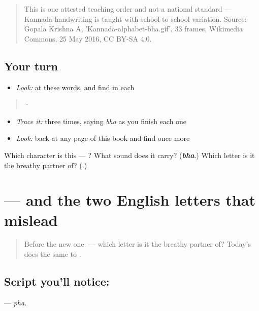 \begin{quote}
This is one attested teaching order and not a national standard — Kannada handwriting is taught with school-to-school variation. Source: Gopala Krishna A, 'Kannada-alphabet-bha.gif', 33 frames, Wikimedia Commons, 25 May 2016, CC BY-SA 4.0.
\end{quote}

\subsection*{Your turn}
\begin{itemize}
\raggedright
  \item \emph{Look:} at these words, and find  in each
\end{itemize}

\begin{quote}
   ·  
\end{quote}

\begin{itemize}
\raggedright
  \item \emph{Trace it:}  three times, saying \emph{bha} as you finish each one
  \item \emph{Look:} back at any page of this book and find  once more
\end{itemize}

\begin{tcolorbox}[breakable,colback=teal!4,colframe=teal!35!black,title={Before you move on}]
Which character is this — ? What sound does it carry? (\emph{\textbf{bha}}.) Which letter is it the breathy partner of? (\textbf{}.)
\end{tcolorbox}
\section[\texorpdfstring{\kn{ಫ} (pha)}{ಫ (pha)}]{ — and the two English letters that mislead}

\label{lesson:KA-S169-letter-pha}



\begin{quote}
Before the new one:  — which letter is it the breathy partner of? Today's does the same to .
\end{quote}

\subsection*{Script you'll notice: }
\textbf{} — \emph{pha}.

